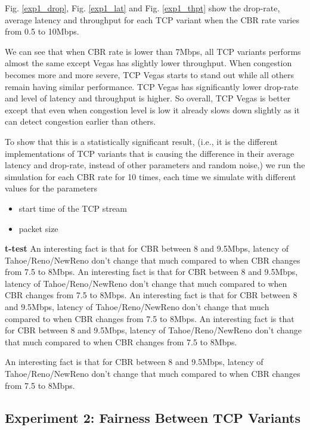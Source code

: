 \documentclass[10pt, conference]{IEEEtran/IEEEtran}
\begin{document}
Fig. \ref{exp1_drop}, Fig. \ref{exp1_lat} and Fig. \ref{exp1_thpt} show the drop-rate, average latency and throughput for each TCP variant when the CBR rate varies from 0.5 to 10Mbps. 

We can see that when CBR rate is lower than 7Mbps, all TCP variants performs almost the same except Vegas has slightly lower throughput. When congestion becomes more and more severe, TCP Vegas starts to stand out while all others remain having similar performance. TCP Vegas has significantly lower drop-rate and level of latency and throughput is higher. So overall, TCP Vegas is better except that even when congestion level is low it already slows down slightly as it can detect congestion earlier than others\cite{vegas}.

To show that this is a statistically significant result, (i.e., it is the different implementations of TCP variants that is causing the difference in their average latency and drop-rate, instead of other parameters and random noise,) we run the simulation for each CBR rate for 10 times, each time we simulate with different values for the parameters

\begin{itemize}
\item start time of the TCP stream
\item packet size
\end{itemize}

\textbf{t-test}
An interesting fact is that for CBR between 8 and 9.5Mbps, latency of Tahoe/Reno/NewReno don't change that much compared to when CBR changes from 7.5 to 8Mbps.
An interesting fact is that for CBR between 8 and 9.5Mbps, latency of Tahoe/Reno/NewReno don't change that much compared to when CBR changes from 7.5 to 8Mbps.
An interesting fact is that for CBR between 8 and 9.5Mbps, latency of Tahoe/Reno/NewReno don't change that much compared to when CBR changes from 7.5 to 8Mbps.
An interesting fact is that for CBR between 8 and 9.5Mbps, latency of Tahoe/Reno/NewReno don't change that much compared to when CBR changes from 7.5 to 8Mbps.

An interesting fact is that for CBR between 8 and 9.5Mbps, latency of Tahoe/Reno/NewReno don't change that much compared to when CBR changes from 7.5 to 8Mbps.

\subsection{Experiment 2: Fairness Between TCP Variants}
\end{document}

